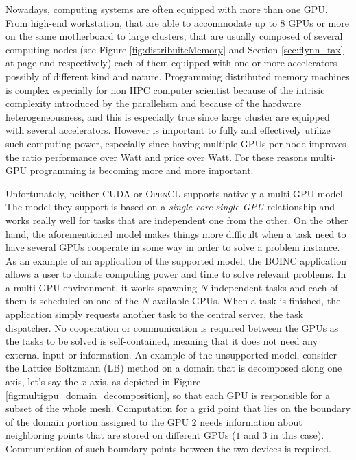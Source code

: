 Nowadays, computing systems are often equipped with more than one GPU. From high-end workstation, that are able to accommodate up to 8 GPUs or more on the same motherboard to large clusters, that are usually composed of several computing nodes (see Figure \ref{fig:distribuiteMemory} and Section \ref{sec:flynn_tax} at page \pageref{fig:distribuiteMemory} and \pageref{sec:flynn_tax} respectively) each of them equipped with one or more accelerators possibly of different kind and nature. Programming distributed memory machines is complex especially for non HPC computer scientist because of the intrisic complexity introduced by the parallelism and because of the hardware heterogeneousness, and this is especially true since large cluster are equipped with several accelerators. However is important to fully and effectively utilize such computing power, especially since having multiple GPUs per node improves the ratio performance over Watt and  price over Watt. For these reasons multi-GPU programming is becoming more and more important.

Unfortunately, neither \textsc{CUDA} or \textsc{OpenCL} supports natively a multi-GPU model. The model they support is based on a \textit{single core}-\textit{single GPU} relationship and works really well for tasks that are independent one from the other.
On the other hand, the aforementioned model makes things  more difficult when a task need to have several GPUs cooperate in some way in order to solve a problem instance.
As an example of an application of the supported model, the \textsc{BOINC} application \cite{anderson:2004} allows a user to donate computing power and time to solve relevant problems. In a multi GPU environment, it works spawning $N$ independent tasks and each of them is scheduled on one of the $N$ available GPUs.
When a task is finished, the application simply requests another task to the central server, the task dispatcher. No cooperation or communication is required between the GPUs as the tasks to be solved is self-contained, meaning that it does not need any external input or information.
An example of the unsupported model, consider the Lattice Boltzmann (LB) \cite{McNamara&Zanetti-1988} \cite{Aidun2010439} \cite{Higuera&Jimenez-1989} method on a domain that is decomposed along one axis, let's say the $x$ axis, as depicted in Figure \ref{fig:multigpu_domain_decomposition}, so that each GPU is responsible for a subset of the whole mesh. Computation for a grid point that lies on the boundary of the domain portion assigned to the GPU $2$ needs information about neighboring points that are stored on different GPUs ($1$ and $3$ in this case).
Communication of such boundary points between the two devices is required.


